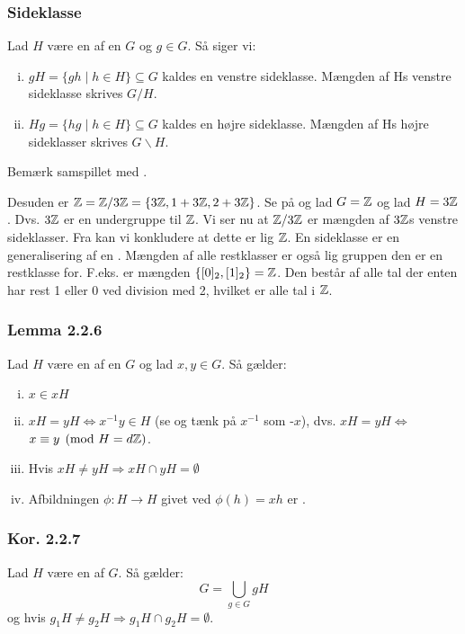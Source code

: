 \subsubsection{Sideklasse}
\label{Sideklasse}
Lad $H$ være en  af en  $G$ og $g \in G$.
Så siger vi: \begin{enumerate}[(i)]
  \item $gH = \{gh \mid h \in H\} \subseteq G$ kaldes en venstre sideklasse.
  Mængden af Hs venstre sideklasse skrives $G\slash H$.
  \item $Hg = \{hg \mid h \in H\} \subseteq G$ kaldes en højre sideklasse.
  Mængden af Hs højre sideklasser skrives $G\backslash H$.
\end{enumerate}
Bemærk samspillet med .

Desuden er $\mathbb{Z} = \mathbb{Z}/3\mathbb{Z} = \{3\mathbb{Z}, 1 + 3\mathbb{Z}, 2 + 3\mathbb{Z} \}$. Se på  og
lad $G = \mathbb{Z}$ og lad $H = 3\mathbb{Z}$. Dvs. $3\mathbb{Z}$ er en undergruppe til $\mathbb{Z}$. Vi ser nu
at $\mathbb{Z}/3\mathbb{Z}$ er mængden af $3\mathbb{Z}$s venstre sideklasser. Fra  kan
vi konkludere at dette er lig $\mathbb{Z}$. En sideklasse er en generalisering af en
. Mængden af alle restklasser er også lig gruppen den er en
restklasse for. F.eks. er mængden $\{[0]_2,[1]_2 \} = \mathbb{Z}$. Den består af alle
tal der enten har rest 1 eller 0 ved division med 2, hvilket er alle tal i $\mathbb{Z}$.

\subsubsection{Lemma 2.2.6}
Lad $H$ være en  af en  $G$ og lad $x,y \in
G$. Så gælder: 
\begin{enumerate}[(i)]
  \item $x \in xH$
  \item $xH = yH \iff x^{-1}y \in H$ (se  og tænk på $x^{-1}$ som
  -$x$), dvs. $xH = yH \iff$ $x \equiv y \pmod{H = d\mathbb{Z}}$.
  \item Hvis $xH \neq yH \Rightarrow xH \cap yH = \emptyset$
  \item Afbildningen $\phi: H \rightarrow H$ givet ved $\phi(h) = xh$ er
  .
\end{enumerate}

\subsubsection{Kor. 2.2.7}
\label{2.2.7}
Lad $H$ være en  af $G$. Så gælder:
\begin{equation*}
  G = \bigcup_{g \in G} gH
\end{equation*}
og hvis $g_1 H \neq g_2 H \Rightarrow g_1 H \cap g_2 H = \emptyset$.

